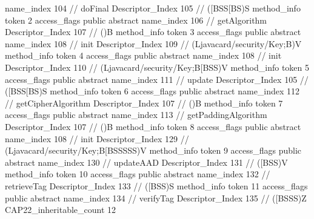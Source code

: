 {{{{{					name_index	104		// doFinal
					Descriptor_Index	105		// ([BSS[BS)S
				}
				method_info {
					token	2
					access_flags	public abstract
					name_index	106		// getAlgorithm
					Descriptor_Index	107		// ()B
				}
				method_info {
					token	3
					access_flags	public abstract
					name_index	108		// init
					Descriptor_Index	109		// (Ljavacard/security/Key;B)V
				}
				method_info {
					token	4
					access_flags	public abstract
					name_index	108		// init
					Descriptor_Index	110		// (Ljavacard/security/Key;B[BSS)V
				}
				method_info {
					token	5
					access_flags	public abstract
					name_index	111		// update
					Descriptor_Index	105		// ([BSS[BS)S
				}
				method_info {
					token	6
					access_flags	public abstract
					name_index	112		// getCipherAlgorithm
					Descriptor_Index	107		// ()B
				}
				method_info {
					token	7
					access_flags	public abstract
					name_index	113		// getPaddingAlgorithm
					Descriptor_Index	107		// ()B
				}
				method_info {
					token	8
					access_flags	public abstract
					name_index	108		// init
					Descriptor_Index	129		// (Ljavacard/security/Key;B[BSSSSS)V
				}
				method_info {
					token	9
					access_flags	public abstract
					name_index	130		// updateAAD
					Descriptor_Index	131		// ([BSS)V
				}
				method_info {
					token	10
					access_flags	public abstract
					name_index	132		// retrieveTag
					Descriptor_Index	133		// ([BSS)S
				}
				method_info {
					token	11
					access_flags	public abstract
					name_index	134		// verifyTag
					Descriptor_Index	135		// ([BSSS)Z
				}
			}
			CAP22_inheritable_count	12
		}
	}
}
